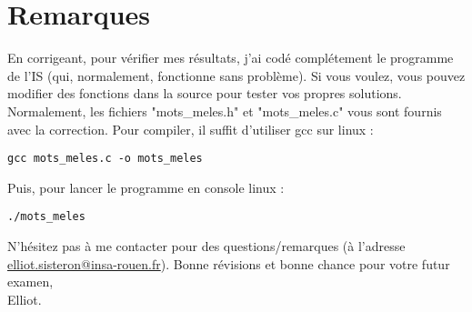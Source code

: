 \documentclass[a4paper,11pt]{article}
\begin{document}
\section*{Remarques}
En corrigeant, pour vérifier mes résultats, j'ai codé complétement le programme de l'IS (qui, normalement, fonctionne sans problème).
Si vous voulez, vous pouvez modifier des fonctions dans la source pour tester vos propres solutions.
Normalement, les fichiers "mots\_meles.h" et "mots\_meles.c" vous sont fournis avec la correction.
Pour compiler, il suffit d'utiliser gcc sur linux :
\begin{lstlisting}[caption=Compiler le programme]
gcc mots_meles.c -o mots_meles
\end{lstlisting}
Puis, pour lancer le programme en console linux :
\begin{lstlisting}[caption=Lancer le programme]
./mots_meles
\end{lstlisting}

N'hésitez pas à me contacter pour des questions/remarques (à l'adresse \href{mailto:elliot.sisteron@insa-rouen.fr}{elliot.sisteron@insa-rouen.fr}).
Bonne révisions et bonne chance pour votre futur examen,\\

Elliot.
\end{document}
